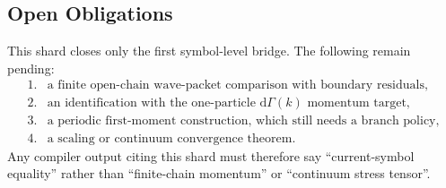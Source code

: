 \subsection{Open Obligations}

This shard closes only the first symbol-level bridge.  The following remain
pending:
\[
\begin{array}{ll}
1.&\text{a finite open-chain wave-packet comparison with boundary residuals,}\\
2.&\text{an identification with the one-particle }\mathrm d\Gamma(k)
      \text{ momentum target,}\\
3.&\text{a periodic first-moment construction, which still needs a branch
      policy,}\\
4.&\text{a scaling or continuum convergence theorem.}
\end{array}
\]
Any compiler output citing this shard must therefore say ``current-symbol
equality'' rather than ``finite-chain momentum'' or ``continuum stress tensor''.
